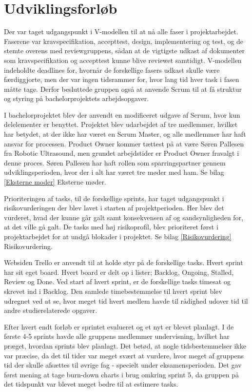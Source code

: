 \section{Udviklingsforløb}
Der var taget udgangspunkt i V-modellen til at nå alle faser i projektarbejdet. Faserene var kravspecifikation, accepttest, design, implementering og test, og de stemte overens med reviewgruppens, sådan at de vigtigste udkast af dokumenter som kravspecifikation og accepttest kunne blive reviewet samtidigt. V-modellen indeholdte deadlines for, hvornår de forskellige fasers udkast skulle være færdiggjorte, men der var ingen tidsrammer for, hvor lang tid hver task i fasen måtte tage. Derfor besluttede gruppen også at anvende Scrum til at få struktur og styring på bachelorprojektets arbejdsopgaver.

I bachelorprojektet blev der anvendt en modificeret udgave af Scrum, hvor kun delelementer er benyttet. Projektet blev udarbejdet af tre medlemmer, hvilket har betydet, at der ikke har været en Scrum Master, og alle medlemmer har haft ansvar for processen. Product Owner kommer tættest på at være Søren Pallesen fra Robotic Ultrasound, men grundet arbejdstider er Product Owner fravalgt i denne proces. Søren Pallesen har haft rollen som sparringspartner gennem udviklingsperioden, hvor der i alt har været tre møder med ham. Se bilag \ref{Eksterne moder} Eksterne møder. 

Prioriteringen af tasks, til de forskellige sprints, har taget udgangspunkt i risikovurderingen der blev lavet i starten af projektperioden. Her blev det vurderet, hvad der kunne går galt samt konsekvensen af og sandsynligheden for, at det ville gå galt. De tasks med høj risikoprofil, blev prioriteret først i projektarbejdet for at undgå blokader i projektet. Se bilag \ref{Risikovurdering} Risikovurdering.  

Websiden Trello er anvendt til at holde styr på de forskellige tasks. Hvert sprint har sit eget board. Hvert board er delt op i lister; Backlog, Ongoing, Stalled, Review og Done. Ved start af hvert sprint, er de forskellige tasks timesat og skrevet ind i Backlog. Den samlede timebestemmelse til hvert sprint blev udregnet ved at se, hvor meget tid hvert medlem havde til rådighed udover tid til andre studierelaterede opgaver. 

Efter hvert endt forløb er sprintet evalueret og et nyt er blevet planlagt. I de første 4-5 sprints havde alle gruppens medlemmer undervisning, hvilket har præget, hvordan sprints blev planlagt. Det betød, at nogle tidsbestemmelser ikke var præcise, da det til tider var meget svært at vurdere, hvor meget af gruppens tid der skulle afsættes til øvrige fag - specielt under eksamensperioden. Det gav først mening at tage burn-down charts i brug omkring sprint 5, da gruppen på det tidspunkt var blevet meget bedre til at estimere tasks.


